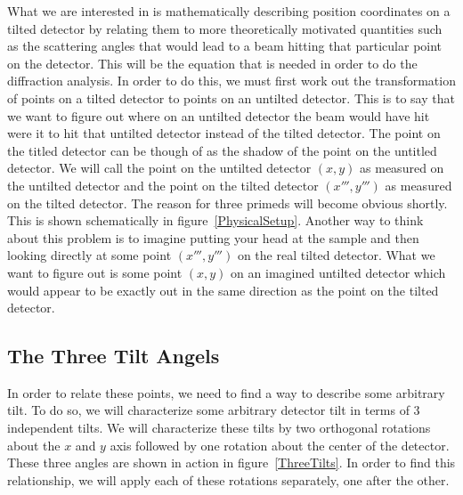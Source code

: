 \begin{SCfigure}[1][htb]
\centering

\caption{This diagram illustrates how tilted geometries 
allow for the collection of diffraction data at more 
extreme angles without the need for a larger detector.}
\label{HigherQValues}
\end{SCfigure}

What we are interested in is mathematically describing 
position coordinates on a tilted detector by relating 
them to more theoretically motivated quantities such as 
the scattering angles that would lead to a beam hitting
that particular point on the detector. This will be 
the equation that is needed in order to do the diffraction 
analysis. In order to do this, we must first work
out the transformation of points on a tilted detector
to points on an untilted detector. This is to say
that we want to figure out where on an untilted 
detector the beam would have hit were it to hit
that untilted detector instead of the tilted detector.
The point on the titled detector can be though of
as the shadow of the point on the untitled detector.
We will call the point on the untilted detector
$(x,y)$ as measured on the untilted detector
and the point on the tilted detector
$(x''',y''')$ as measured on the tilted detector. 
The reason for three primeds will become obvious
shortly. This is shown schematically in 
figure~\ref{PhysicalSetup}. Another way to think
about this problem is to imagine putting your 
head at the sample and then looking directly 
at some point $(x''',y''')$ on the real
tilted detector. What we want to figure out
is some point $(x,y)$ on an imagined untilted 
detector which would appear to be exactly out in
the same direction as the point on the tilted 
detector.


\begin{SCfigure}[1][htb]
\centering

\caption{The setup of the experiment. Here, the detector 
is titled by some arbitrary angle with respect to the 
incoming beam. We will call some arbitrary point on 
the tilted detector as $(x''',y''')$. We are interested in 
relating this point to the point $(x,y)$ on some imagined 
un-tilted detector where a scattered beam would have hit 
were that tilted detector set up instead of the tilted
detector.}
\label{PhysicalSetup}
\end{SCfigure}

\subsection{The Three Tilt Angels}
\index{$\alpha$} \index{$\beta$}  
In order to relate these points, we need to find a way to 
describe some arbitrary tilt. To do so, we will 
characterize some arbitrary detector tilt in terms of
3 independent tilts. We will characterize these tilts 
by two orthogonal rotations about the $x$ and $y$ axis 
followed by one rotation about the center of the detector.
These three angles are shown in action in figure~\ref{ThreeTilts}.
In order to find this relationship, we will apply each of these 
rotations separately, one after the other. 


